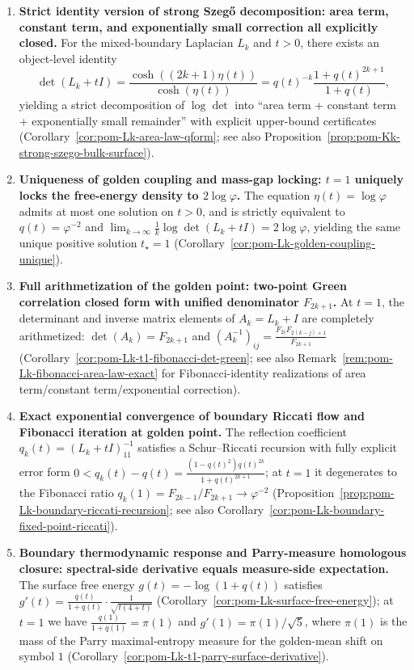 \begin{enumerate}
  \item \textbf{Strict identity version of strong Szeg\H{o} decomposition: area term, constant term, and exponentially small correction all explicitly closed.}
  For the mixed-boundary Laplacian \(L_k\) and \(t>0\), there exists an object-level identity
  \[
  \det(L_k+tI)=\frac{\cosh((2k+1)\eta(t))}{\cosh(\eta(t))}
  =q(t)^{-k}\frac{1+q(t)^{2k+1}}{1+q(t)},
  \]
  yielding a strict decomposition of \(\log\det\) into ``area term + constant term + exponentially small remainder'' with explicit upper-bound certificates (Corollary~\ref{cor:pom-Lk-area-law-qform}; see also Proposition~\ref{prop:pom-Kk-strong-szego-bulk-surface}).

  \item \textbf{Uniqueness of golden coupling and mass-gap locking: \texorpdfstring{$t=1$}{t=1} uniquely locks the free-energy density to \texorpdfstring{$2\log\varphi$}{2 log phi}.}
  The equation \(\eta(t)=\log\varphi\) admits at most one solution on \(t>0\), and is strictly equivalent to \(q(t)=\varphi^{-2}\) and
  \(\lim_{k\to\infty}\frac1k\log\det(L_k+tI)=2\log\varphi\),
  yielding the same unique positive solution \(t_\star=1\) (Corollary~\ref{cor:pom-Lk-golden-coupling-unique}).

  \item \textbf{Full arithmetization of the golden point: two-point Green correlation closed form with unified denominator \texorpdfstring{$F_{2k+1}$}{F_{2k+1}}.}
  At \(t=1\), the determinant and inverse matrix elements of \(A_k=L_k+I\) are completely arithmetized:
  \(\det(A_k)=F_{2k+1}\) and
  \((A_k^{-1})_{ij}=\frac{F_{2i}F_{2(k-j)+1}}{F_{2k+1}}\)
  (Corollary~\ref{cor:pom-Lk-t1-fibonacci-det-green}; see also Remark~\ref{rem:pom-Lk-fibonacci-area-law-exact} for Fibonacci-identity realizations of area term/constant term/exponential correction).

  \item \textbf{Exact exponential convergence of boundary Riccati flow and Fibonacci iteration at golden point.}
  The reflection coefficient \(q_k(t)=(L_k+tI)^{-1}_{11}\) satisfies a Schur--Riccati recursion with fully explicit error form
  \(0<q_k(t)-q(t)=\frac{(1-q(t)^2)q(t)^{2k}}{1+q(t)^{2k+1}}\);
  at \(t=1\) it degenerates to the Fibonacci ratio
  \(q_k(1)=F_{2k-1}/F_{2k+1}\to\varphi^{-2}\)
  (Proposition~\ref{prop:pom-Lk-boundary-riccati-recursion}; see also Corollary~\ref{cor:pom-Lk-boundary-fixed-point-riccati}).

  \item \textbf{Boundary thermodynamic response and Parry-measure homologous closure: spectral-side derivative equals measure-side expectation.}
  The surface free energy \(g(t)=-\log(1+q(t))\) satisfies
  \(g'(t)=\frac{q(t)}{1+q(t)}\cdot\frac{1}{\sqrt{t(4+t)}}\)
  (Corollary~\ref{cor:pom-Lk-surface-free-energy});
  at \(t=1\) we have
  \(\frac{q(1)}{1+q(1)}=\pi(1)\) and \(g'(1)=\pi(1)/\sqrt5\), where \(\pi(1)\) is the mass of the Parry maximal-entropy measure for the golden-mean shift on symbol \(1\) (Corollary~\ref{cor:pom-Lk-t1-parry-surface-derivative}).


\end{enumerate}

